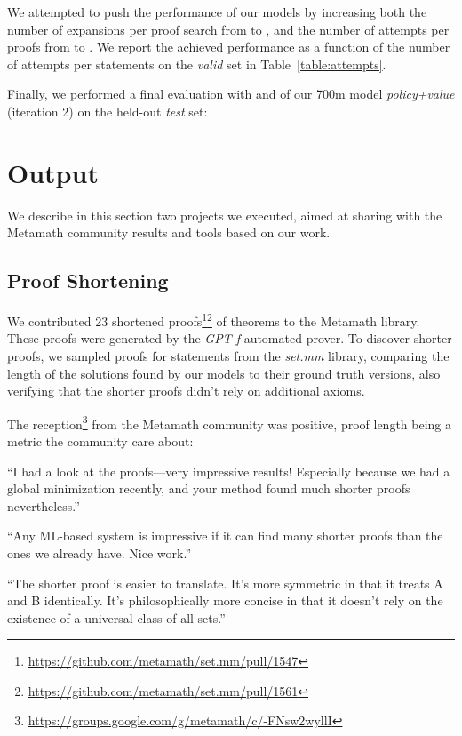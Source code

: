 \documentclass{article}
\begin{document}
We attempted to push the performance of our models by increasing both the number of expansions per proof search from  to , and the number of attempts per proofs from  to . We report the achieved performance as a function of the number of attempts per statements on the \textit{valid} set in Table~\ref{table:attempts}.

Finally, we performed a final evaluation with  and  of our 700m model \textit{policy+value} (iteration 2) on the held-out \textit{test} set:



\section{Output}

We describe in this section two projects we executed, aimed at sharing with the Metamath community results and tools based on our work.

\subsection{Proof Shortening}

We contributed 23 shortened proofs\footnote{\url{https://github.com/metamath/set.mm/pull/1547}}\footnote{\url{https://github.com/metamath/set.mm/pull/1561}} of theorems to the Metamath library. These proofs were generated by the \textit{GPT-f} automated prover. To discover shorter proofs, we sampled proofs for statements from the \textit{set.mm} library, comparing the length of the solutions found by our models to their ground truth versions, also verifying that the shorter proofs didn't rely on additional axioms.

The reception\footnote{\url{https://groups.google.com/g/metamath/c/-FNsw2wyllI}} from the Metamath community was positive, proof length being a metric the community care about:

\begin{displayquote}
“I had a look at the proofs—very impressive results! Especially because we had a global minimization recently, and your method found much shorter proofs nevertheless.”
\end{displayquote}

\begin{displayquote}
“Any ML-based system is impressive if it can find many shorter proofs than the ones we already have. Nice work.”
\end{displayquote}

\begin{displayquote}
“The shorter proof is easier to translate. It’s more symmetric in that it treats A and B identically. It’s philosophically more concise in that it doesn’t rely on the existence of a universal class of all sets.”
\end{displayquote}
\end{document}
